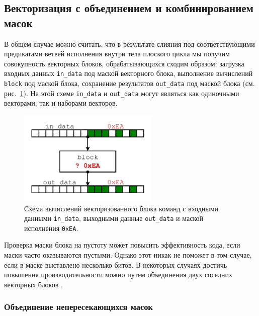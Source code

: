 \subsection{Векторизация с объединением и комбинированием масок}

В общем случае можно считать, что в результате слияния под соответствующими предикатами ветвей исполнения внутри тела плоского цикла мы получим совокупность векторных блоков, обрабатывающихся сходим образом: загрузка входных данных \texttt{in\_data} под маской векторного блока, выполнение вычислений \texttt{block} под маской блока, сохранение результатов \texttt{out\_data} под маской блока (см. рис.~\ref{fig:text_4_vec_comb_mask_vec_block}).
На этой схеме \texttt{in\_data} и \texttt{out\_data} могут являться как одиночными векторами, так и наборами векторов.

\begin{figure}[ht]
\centering
\includegraphics[width=0.6\textwidth]{./pics/text_4_vec_comb_mask/vec_block.pdf}
\singlespacing
{}\caption{Схема вычислений векторизованного блока команд с входными данными \texttt{in\_data}, выходными данные \texttt{out\_data} и маской исполнения \texttt{0xEA}.}
\label{fig:text_4_vec_comb_mask_vec_block}
\end{figure}

Проверка маски блока на пустоту может повысить эффективность кода, если маски часто оказываются пустыми.
Однако этот никак не поможет в том случае, если в маске выставлено несколько битов.
В некоторых случаях достичь повышения производительности можно путем объединения двух соседних векторных блоков \cite{Rybakov2024VecComb}.

\subsubsection{Объединение непересекающихся масок}

